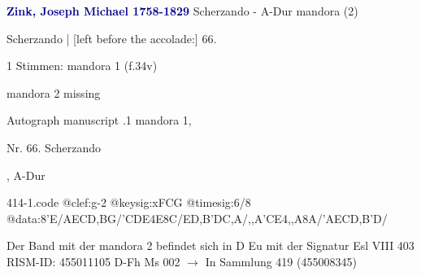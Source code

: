\documentclass[twocolumn]{book}
\begin{document}
\newline \par \vspace{7pt} \textcolor{darkblue}{\textbf{Zink, Joseph Michael  1758-1829}}
\newline Scherzando - A-Dur
\newline mandora (2)
\newline \begin{itshape}[f.34v, at left:] Scherzando | [left before the accolade:] 66.\end{itshape} 
\newline \textcolor{darkblue}{}  1 Stimmen: mandora 1  (f.34v)
\newline \begin{small} mandora 2 missing\end{small} 
\newline Autograph manuscript
.1  mandora 1, \begin{itshape}Nr. 66. Scherzando\end{itshape}, A-Dur  
\begin{filecontents*}{414-1.code}
@clef:g-2
@keysig:xFCG
@timesig:6/8
@data:8'E/AECD,BG/'CDE4E8C/ED,B'DC,A/,,A'CE4,,A8A/'AECD,B'D/
\end{filecontents*}
\newline
%
\newline Der Band mit der mandora 2 befindet sich in D Eu mit der Signatur Esl VIII 403
\newline RISM-ID: 455011105
\newline D-Fh  Ms 002
\newline $\rightarrow$ In Sammlung 419 (455008345)
      
\end{document}
